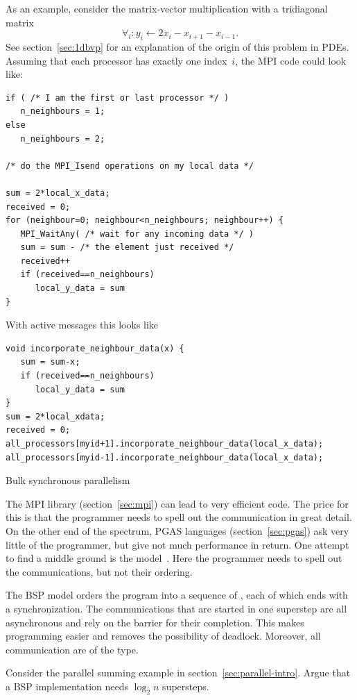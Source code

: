 As an example, consider the matrix-vector multiplication with a
tridiagonal matrix
\[ \forall_i\colon y_i\leftarrow 2x_i-x_{i+1}-x_{i-1}. \]
See section~\ref{sec:1dbvp} for an explanation of the origin of this
problem in \acp{PDE}. Assuming that each processor has exactly one
index~$i$, the MPI code could look like:
\begin{verbatim}
if ( /* I am the first or last processor */ )
   n_neighbours = 1;
else
   n_neighbours = 2;

/* do the MPI_Isend operations on my local data */

sum = 2*local_x_data;
received = 0;
for (neighbour=0; neighbour<n_neighbours; neighbour++) {
   MPI_WaitAny( /* wait for any incoming data */ )
   sum = sum - /* the element just received */
   received++
   if (received==n_neighbours)
      local_y_data = sum
}
\end{verbatim}
With active messages this looks like
\begin{verbatim}
void incorporate_neighbour_data(x) {
   sum = sum-x;
   if (received==n_neighbours)
      local_y_data = sum
}
sum = 2*local_xdata;
received = 0;
all_processors[myid+1].incorporate_neighbour_data(local_x_data);
all_processors[myid-1].incorporate_neighbour_data(local_x_data);
\end{verbatim}

 {Bulk synchronous parallelism}
\label{sec:bsp}

The MPI library (section~\ref{sec:mpi}) can lead to very efficient
code. The price for this is that the programmer needs to spell out the
communication in great detail. On the other end of the spectrum, PGAS
languages (section~\ref{sec:pgas}) ask very little of the programmer,
but give not much performance in return. One attempt to find a middle
ground is the 
model~\cite{Valiant:1990:BSP,Skillicorn96questionsand}. Here the
programmer needs to spell out the communications, but not their
ordering.

The \ac{BSP} model orders the program into a sequence of
, each of which ends with a 
synchronization.  The communications that are started in one superstep
are all asynchronous and rely on the barrier for their completion.  This
makes programming easier and removes the possibility of deadlock.
Moreover, all communication are of the 
type.

\begin{exercise}
  Consider the parallel summing example in
  section~\ref{sec:parallel-intro}. Argue that a \ac{BSP}
  implementation needs $\log_2n$ supersteps.
\end{exercise}

